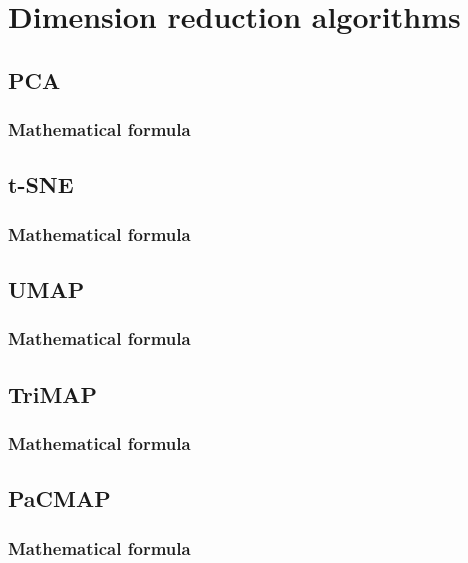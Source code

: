 \chapter{Dimension reduction algorithms}

\section{PCA}

\subsection{Mathematical formula}


\section{t-SNE}

\subsection{Mathematical formula}


\section{UMAP}

\subsection{Mathematical formula}


\section{TriMAP}

\subsection{Mathematical formula}


\section{PaCMAP}

\subsection{Mathematical formula}


